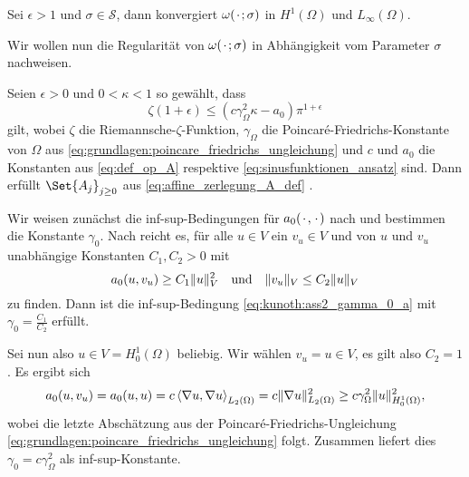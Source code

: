 \begin{Korollar}
    Sei $\epsilon > 1$ und $\sigma \in \mathcal S$, dann konvergiert $\omega({\mkern2mu\cdot\mkern2mu}; \sigma)$ in $H^{1}(\Omega)$ und $L_{\infty}(\Omega)$.
\end{Korollar}

Wir wollen nun die Regularität von $\omega({\mkern2mu\cdot\mkern2mu}; \sigma)$ in Abhängigkeit vom Parameter $\sigma$ nachweisen.

\begin{Satz}
\label{satz:regularitaet_nachrechnen}
    Seien $\epsilon > 0$ und $0 < \kappa < 1$ so gewählt, dass
    \begin{equation}
        \zeta(1 + \epsilon) \leq (c \gamma_{\Omega}^{2} \kappa - a_{0}) \pi^{1+\epsilon}
    \end{equation}
    gilt,
    wobei $\zeta$ die Riemannsche-$\zeta$-Funktion, $\gamma_{\Omega}$ die Poincaré-Friedrichs-Konstante von $\Omega$ aus \eqref{eq:grundlagen:poincare_friedrichs_ungleichung} und $c$ und $a_{0}$ die Konstanten aus \eqref{eq:def_op_A} respektive \eqref{eq:sinusfunktionen_ansatz} sind.
    Dann erfüllt $\Set{ A_{j} }_{j \geq 0}$ aus \eqref{eq:affine_zerlegung_A_def} .

    \begin{Beweis}
        Wir weisen zunächst die inf-sup-Bedingungen für $a_{0}({\mkern2mu\cdot\mkern2mu}, {\mkern2mu\cdot\mkern2mu})$ nach und bestimmen die Konstante $\gamma_{0}$.
        Nach  reicht es, für alle $u \in V$ ein $v_{u} \in V$ und von $u$ und $v_{u}$ unabhängige Konstanten $C_{1}, C_{2} > 0$ mit
        \begin{equation}
            a_{0}(u, v_{u}) \geq C_{1} \lVert u\rVert_{V}^{2} \quad \text{und} \quad \lVert v_{u}\rVert_{V} \leq C_{2} \lVert u\rVert_{V}
        \end{equation}
        zu finden.
        Dann ist die inf-sup-Bedingung \eqref{eq:kunoth:ass2_gamma_0_a} mit $\gamma_{0} = \frac{C_{1}}{C_{2}}$ erfüllt.

        Sei nun also $u \in V = H^{1}_{0}(\Omega)$ beliebig.
        Wir wählen $v_{u} = u \in V$, es gilt also $C_{2} = 1$.
        Es ergibt sich
        \begin{align}
            a_{0}(u, v_{u}) = a_{0}(u, u) = c \left\langle\nabla u,\nabla u\right\rangle_{L_{2}(\Omega)} = c \lVert\nabla u\rVert_{L_{2}(\Omega)}^{2} \geq c \gamma_{\Omega}^{2} \lVert u\rVert_{H^{1}_{0}(\Omega)}^{2},
        \end{align}
        wobei die letzte Abschätzung aus der Poincaré-Friedrichs-Ungleichung \eqref{eq:grundlagen:poincare_friedrichs_ungleichung} folgt.
        Zusammen liefert dies $\gamma_{0} = c \gamma_{\Omega}^{2}$ als inf-sup-Konstante.


\end{Beweis}
\end{Satz}
